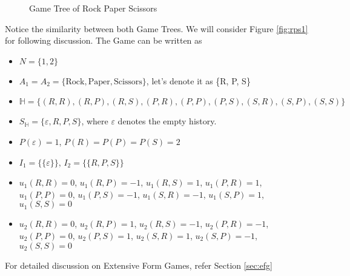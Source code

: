 \begin{exm}{\label{exm:rps}}
\begin{figure}[H]
    \caption{Game Tree of Rock Paper Scissors}
    \end{figure}
    Notice the similarity between both Game Trees. We will consider Figure \ref{fig:rps1} for following discussion.
    The Game can be written as
    \begin{itemize}
    \item $N = \{1, 2\}$
    \item $A_1 = A_2 = \{\text{Rock}, \text{Paper}, \text{Scissors}\}$, let's denote it as \{R, P, S\}
    \item $\mathbb{H} = \{(R, R), (R, P), (R, S), (P, R), (P, P), (P, S), (S, R), (S, P), (S, S)\}$
    \item $S_\mathbb{H} = \{\varepsilon, R, P, S\}$, where $\varepsilon$ denotes the empty history.
    \item $P(\varepsilon) = 1$, $P(R) = P(P) = P(S) = 2$
    \item $I_1 = \{\{\varepsilon\}\}$, $I_2 = \{\{R, P, S\}\}$
    \item $u_1(R, R) = 0$, $u_1(R, P) = -1$, $u_1(R, S) = 1$, $u_1(P, R) = 1$, $u_1(P, P) = 0$, $u_1(P, S) = -1$, $u_1(S, R) = -1$, $u_1(S, P) = 1$, $u_1(S, S) = 0$
    \item $u_2(R, R) = 0$, $u_2(R, P) = 1$, $u_2(R, S) = -1$, $u_2(P, R) = -1$, $u_2(P, P) = 0$, $u_2(P, S) = 1$, $u_2(S, R) = 1$, $u_2(S, P) = -1$, $u_2(S, S) = 0$
    \end{itemize}
\end{exm}
For detailed discussion on Extensive Form Games, refer Section \ref{sec:efg}
